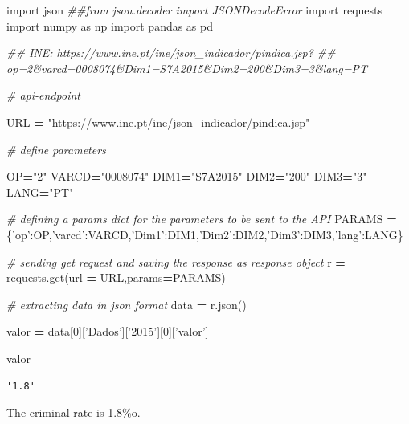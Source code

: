 \documentclass[
  12pt,
]{article}
\newenvironment{Shaded}{\begin{snugshade}}{\end{snugshade}}
\newcommand{\CommentTok}[1]{\textcolor[rgb]{0.56,0.35,0.01}{\textit{#1}}}
\newcommand{\DecValTok}[1]{\textcolor[rgb]{0.00,0.00,0.81}{#1}}
\newcommand{\ImportTok}[1]{#1}
\newcommand{\NormalTok}[1]{#1}
\newcommand{\OperatorTok}[1]{\textcolor[rgb]{0.81,0.36,0.00}{\textbf{#1}}}
\newcommand{\StringTok}[1]{\textcolor[rgb]{0.31,0.60,0.02}{#1}}
\begin{document}
\begin{Shaded}
\begin{Highlighting}[]
\ImportTok{import}\NormalTok{ json}
\CommentTok{##from json.decoder import JSONDecodeError}
\ImportTok{import}\NormalTok{ requests}
\ImportTok{import}\NormalTok{ numpy }\ImportTok{as}\NormalTok{ np}
\ImportTok{import}\NormalTok{ pandas }\ImportTok{as}\NormalTok{ pd}

\CommentTok{## INE: https://www.ine.pt/ine/json_indicador/pindica.jsp?}
\CommentTok{## op=2&varcd=0008074&Dim1=S7A2015&Dim2=200&Dim3=3&lang=PT}

\CommentTok{# api-endpoint}

\NormalTok{URL }\OperatorTok{=} \StringTok{"https://www.ine.pt/ine/json_indicador/pindica.jsp"}

\CommentTok{# define parameters}

\NormalTok{OP}\OperatorTok{=}\StringTok{"2"}
\NormalTok{VARCD}\OperatorTok{=}\StringTok{"0008074"}
\NormalTok{DIM1}\OperatorTok{=}\StringTok{"S7A2015"}
\NormalTok{DIM2}\OperatorTok{=}\StringTok{"200"}
\NormalTok{DIM3}\OperatorTok{=}\StringTok{"3"}
\NormalTok{LANG}\OperatorTok{=}\StringTok{"PT"}


\CommentTok{# defining a params dict for the parameters to be sent to the API}
\NormalTok{PARAMS }\OperatorTok{=}\NormalTok{ \{}\StringTok{'op'}\NormalTok{:OP,}\StringTok{'varcd'}\NormalTok{:VARCD,}\StringTok{'Dim1'}\NormalTok{:DIM1,}\StringTok{'Dim2'}\NormalTok{:DIM2,}\StringTok{'Dim3'}\NormalTok{:DIM3,}\StringTok{'lang'}\NormalTok{:LANG\}}

\CommentTok{# sending get request and saving the response as response object}
\NormalTok{r }\OperatorTok{=}\NormalTok{ requests.get(url }\OperatorTok{=}\NormalTok{ URL,params}\OperatorTok{=}\NormalTok{PARAMS)}

\CommentTok{# extracting data in json format}
\NormalTok{data }\OperatorTok{=}\NormalTok{ r.json()}

\NormalTok{valor }\OperatorTok{=}\NormalTok{ data[}\DecValTok{0}\NormalTok{][}\StringTok{'Dados'}\NormalTok{][}\StringTok{'2015'}\NormalTok{][}\DecValTok{0}\NormalTok{][}\StringTok{'valor'}\NormalTok{]}

\NormalTok{valor}
\end{Highlighting}
\end{Shaded}

\begin{verbatim}
'1.8'
\end{verbatim}

The criminal rate is 1.8\%o.
\end{document}
